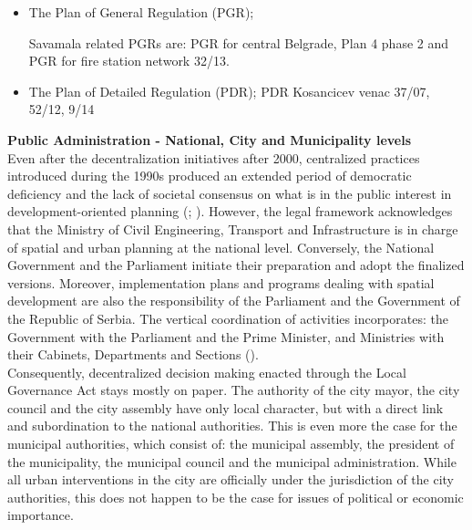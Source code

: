 \documentclass[11pt]{report}
\begin{document}
{{{{\begin{itemize}
\item The Plan of General Regulation (PGR);

Savamala related PGRs are: PGR for central Belgrade, Plan 4 phase 2 and PGR for fire station network 32/13.
\item The Plan of Detailed Regulation (PDR);
PDR Kosancicev venac 37/07, 52/12, 9/14
\end{itemize}

\textbf{Public Administration - National, City and Municipality levels}
\\
Even after the decentralization initiatives after 2000, centralized practices introduced during the 1990s produced an extended period of democratic deficiency and the lack of societal consensus on what is in the public interest in development-oriented planning (\href{Vujosevic}{\citealt{vujosevic_racionalnost_2004}}; \href{Vujosevic}{\citealt{vujosevic_collapse_2010}}).
However, the legal framework acknowledges that the Ministry of Civil Engineering, Transport and Infrastructure is in charge of spatial and urban planning at the national level.
Conversely, the National Government and the Parliament initiate their preparation and adopt the finalized versions.
Moreover, implementation plans and programs dealing with spatial development are also the responsibility of the Parliament and the Government of the Republic of Serbia.
The vertical coordination of activities incorporates: the Government with the Parliament and the Prime Minister, and Ministries with their Cabinets, Departments and Sections (\href{Stojkov}{\citealt{stojkov_prostorno_2012}}).
\\

Consequently, decentralized decision making enacted through the Local Governance Act stays mostly on paper. The authority of the city mayor, the city council and the city assembly have only local character, but with a direct link and subordination to the national authorities. This is even more the case for the municipal authorities, which consist of: the municipal assembly, the president of the municipality, the municipal council and the municipal administration. While all urban interventions in the city are officially under the jurisdiction of the city authorities, this does not happen to be the case for issues of political or economic importance.

}}}}
\end{document}
